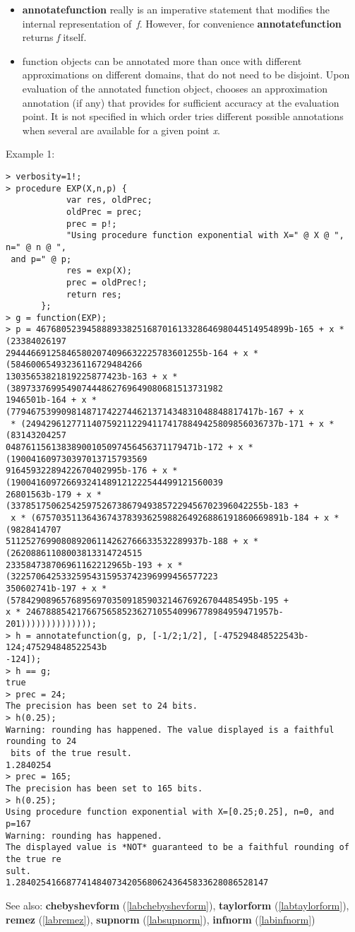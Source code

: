 \begin{itemize}
\item \textbf{annotatefunction} really is an imperative statement that modifies the
   internal representation of~\emph{f}. However, for convenience \textbf{annotatefunction}
   returns \emph{f} itself.

\item \sollya function objects can be annotated more than once with different
   approximations on different domains, that do not need to be disjoint. Upon
   evaluation of the annotated function object, \sollya chooses an
   approximation annotation (if any) that provides for sufficient accuracy at
   the evaluation point. It is not specified in which order \sollya tries
   different possible annotations when several are available for a given
   point \emph{x}.
\end{itemize}
\noindent Example 1: 
\begin{center}\begin{minipage}{15cm}\begin{Verbatim}[frame=single]
> verbosity=1!;
> procedure EXP(X,n,p) {
            var res, oldPrec;
            oldPrec = prec;
            prec = p!;
            "Using procedure function exponential with X=" @ X @ ", n=" @ n @ ",
 and p=" @ p;
            res = exp(X);
            prec = oldPrec!;
            return res;
       };
> g = function(EXP);
> p = 46768052394588893382516870161332864698044514954899b-165 + x * (23384026197
294446691258465802074096632225783601255b-164 + x * (58460065493236116729484266
13035653821819225877423b-163 + x * (389733769954907444862769649080681513731982
1946501b-164 + x * (7794675399098148717422744621371434831048848817417b-167 + x
 * (24942961277114075921122941174178849425809856036737b-171 + x * (83143204257
04876115613838900105097456456371179471b-172 + x * (190041609730397013715793569
91645932289422670402995b-176 + x * (190041609726693241489121222544499121560039
26801563b-179 + x * (33785175062542597526738679493857229456702396042255b-183 +
 x * (6757035113643674378393625988264926886191860669891b-184 + x * (9828414707
511252769908089206114262766633532289937b-188 + x * (26208861108003813314724515
233584738706961162212965b-193 + x * (32257064253325954315953742396999456577223
350602741b-197 + x * (578429089657689569703509185903214676926704485495b-195 + 
x * 2467888542176675658523627105540996778984959471957b-201))))))))))))));
> h = annotatefunction(g, p, [-1/2;1/2], [-475294848522543b-124;475294848522543b
-124]);
> h == g;
true
> prec = 24;
The precision has been set to 24 bits.
> h(0.25);
Warning: rounding has happened. The value displayed is a faithful rounding to 24
 bits of the true result.
1.2840254
> prec = 165;
The precision has been set to 165 bits.
> h(0.25);
Using procedure function exponential with X=[0.25;0.25], n=0, and p=167
Warning: rounding has happened.
The displayed value is *NOT* guaranteed to be a faithful rounding of the true re
sult.
1.28402541668774148407342056806243645833628086528147
\end{Verbatim}
\end{minipage}\end{center}
See also: \textbf{chebyshevform} (\ref{labchebyshevform}), \textbf{taylorform} (\ref{labtaylorform}), \textbf{remez} (\ref{labremez}), \textbf{supnorm} (\ref{labsupnorm}), \textbf{infnorm} (\ref{labinfnorm})
